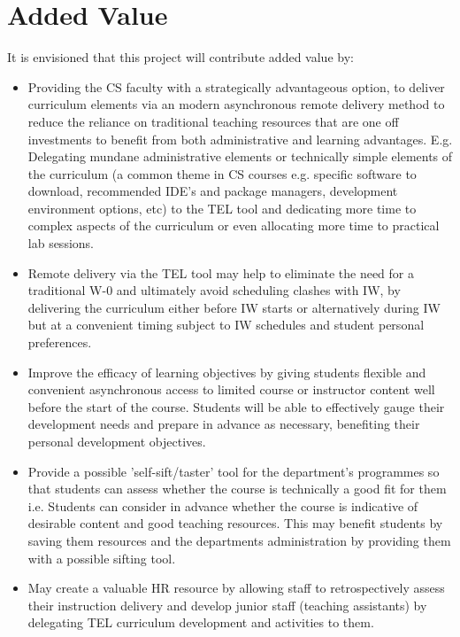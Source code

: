 \section{Added Value}
\label{sec:sec01}

It is envisioned that this project will contribute added value by:
\begin{itemize}
    \item Providing the CS faculty with a strategically advantageous option, to deliver curriculum elements via an modern asynchronous remote delivery method to reduce the reliance on traditional teaching resources that are one off investments to benefit from both administrative and learning advantages. E.g. Delegating mundane administrative elements or technically simple elements of the curriculum (a common theme in CS courses e.g. specific software to download, recommended IDE's and package managers, development environment options, etc) to the TEL tool and dedicating more time to complex aspects of the curriculum or even allocating more time to practical lab sessions.
    
    \item Remote delivery via the TEL tool may help to eliminate the need for a traditional W-0 and ultimately avoid scheduling clashes with IW, by delivering the curriculum either before IW starts or alternatively during IW but at a  convenient timing subject to IW schedules and student personal preferences.
    
    \item Improve the efficacy of learning objectives by giving students flexible and convenient asynchronous access to limited course or instructor content well before the start of the course. Students will be able to effectively gauge their development needs and prepare in advance as necessary, benefiting their personal development objectives.
    
    \item Provide a possible 'self-sift/taster' tool for the department's programmes so that students can assess whether the course is technically a good fit for them i.e. Students can consider in advance whether the course is indicative of desirable content and good teaching resources. This may benefit students by saving them resources and the departments administration by providing them with a possible sifting tool.
    
    \item May create a valuable HR resource by allowing staff to retrospectively assess their instruction delivery and develop junior staff (teaching assistants) by delegating TEL curriculum development and activities to them.
    

\end{itemize}
